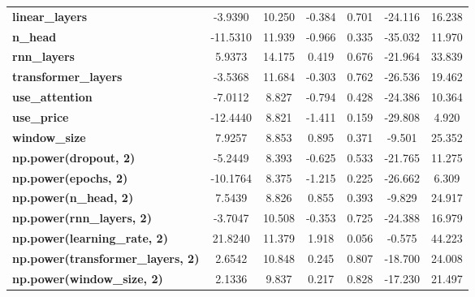 \begin{center}
\begin{tabular}{lcccccc}
\textbf{linear\_layers}                   &      -3.9390  &       10.250     &    -0.384  &         0.701        &      -24.116    &       16.238     \\
\textbf{n\_head}                          &     -11.5310  &       11.939     &    -0.966  &         0.335        &      -35.032    &       11.970     \\
\textbf{rnn\_layers}                      &       5.9373  &       14.175     &     0.419  &         0.676        &      -21.964    &       33.839     \\
\textbf{transformer\_layers}              &      -3.5368  &       11.684     &    -0.303  &         0.762        &      -26.536    &       19.462     \\
\textbf{use\_attention}                   &      -7.0112  &        8.827     &    -0.794  &         0.428        &      -24.386    &       10.364     \\
\textbf{use\_price}                       &     -12.4440  &        8.821     &    -1.411  &         0.159        &      -29.808    &        4.920     \\
\textbf{window\_size}                     &       7.9257  &        8.853     &     0.895  &         0.371        &       -9.501    &       25.352     \\
\textbf{np.power(dropout, 2)}             &      -5.2449  &        8.393     &    -0.625  &         0.533        &      -21.765    &       11.275     \\
\textbf{np.power(epochs, 2)}              &     -10.1764  &        8.375     &    -1.215  &         0.225        &      -26.662    &        6.309     \\
\textbf{np.power(n\_head, 2)}             &       7.5439  &        8.826     &     0.855  &         0.393        &       -9.829    &       24.917     \\
\textbf{np.power(rnn\_layers, 2)}         &      -3.7047  &       10.508     &    -0.353  &         0.725        &      -24.388    &       16.979     \\
\textbf{np.power(learning\_rate, 2)}      &      21.8240  &       11.379     &     1.918  &         0.056        &       -0.575    &       44.223     \\
\textbf{np.power(transformer\_layers, 2)} &       2.6542  &       10.848     &     0.245  &         0.807        &      -18.700    &       24.008     \\
\textbf{np.power(window\_size, 2)}        &       2.1336  &        9.837     &     0.217  &         0.828        &      -17.230    &       21.497     \\

\end{tabular}
\end{center}
